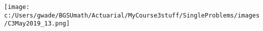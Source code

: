 
\texttt{[image: c:/Users/gwade/BGSUmath/Actuarial/MyCourse3stuff/SingleProblems/images/C3May2019\_13.png]}

\showsol{\bsoln

\esoln}

